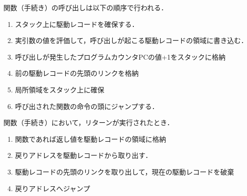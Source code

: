 \documentclass[dvipdfmx,a4j]{jbook}
\begin{document}
関数（手続き）の呼び出しは以下の順序で行われる．
\begin{enumerate}
  \item スタック上に駆動レコードを確保する．
  \item 実引数の値を評価して，呼び出しが起こる駆動レコードの領域に書き込む．
  \item 呼び出しが発生したプログラムカウンタPCの値+1をスタックに格納
  \item 前の駆動レコードの先頭のリンクを格納
  \item 局所領域をスタック上に確保
  \item 呼び出された関数の命令の頭にジャンプする．
\end{enumerate}

関数（手続き）において，リターンが実行されたとき．
\begin{enumerate}
  \item 関数であれば返し値を駆動レコードの領域に格納
  \item 戻りアドレスを駆動レコードから取り出す．
  \item 駆動レコードの先頭のリンクを取り出して，現在の駆動レコードを破棄
  \item 戻りアドレスへジャンプ
\end{enumerate}
\end{document}
